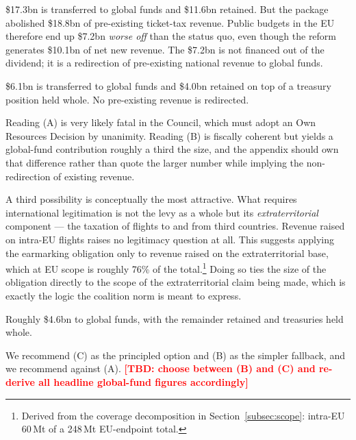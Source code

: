 \documentclass[11pt]{article}
\newcommand{\tbd}[1]{\textcolor{red}{\textbf{[TBD: #1]}}}
\begin{document}
\begin{description}[leftmargin=1.2cm]
  \item[(A) 60\% of \emph{gross} new revenue.] \$17.3bn is transferred to global
  funds and \$11.6bn retained. But the package abolished \$18.8bn of
  pre-existing ticket-tax revenue. Public budgets in the EU therefore end up
  \$7.2bn \emph{worse off} than the status quo, even though the reform generates
  \$10.1bn of net new revenue. The \$7.2bn is not financed out of the dividend;
  it is a redirection of pre-existing national revenue to global funds.
  \item[(B) 60\% of the \emph{net fiscal dividend}.] \$6.1bn is transferred to
  global funds and \$4.0bn retained on top of a treasury position held whole. No
  pre-existing revenue is redirected.
\end{description}

Reading (A) is very likely fatal in the Council, which must adopt an Own
Resources Decision by unanimity. Reading (B) is fiscally coherent but yields a
global-fund contribution roughly a third the size, and the appendix should own
that difference rather than quote the larger number while implying the
non-redirection of existing revenue.

A third possibility is conceptually the most attractive. What requires
international legitimation is not the levy as a whole but its
\emph{extraterritorial} component --- the taxation of flights to and from third
countries. Revenue raised on intra-EU flights raises no legitimacy question at
all. This suggests applying the earmarking obligation only to revenue raised on
the extraterritorial base, which at EU scope is roughly 76\% of the
total.\footnote{Derived from the coverage decomposition in
Section~\ref{subsec:scope}: intra-EU 60\,Mt of a 248\,Mt EU-endpoint total.} Doing
so ties the size of the obligation directly to the scope of the extraterritorial
claim being made, which is exactly the logic the coalition norm is meant to
express.

\begin{description}[leftmargin=1.2cm]
  \item[(C) 60\% of the extraterritorially-raised portion of the net dividend.]
  Roughly \$4.6bn to global funds, with the remainder retained and treasuries
  held whole.
\end{description}

We recommend (C) as the principled option and (B) as the simpler fallback, and we
recommend against (A). \tbd{choose between (B) and (C) and re-derive all
headline global-fund figures accordingly}
\end{document}
